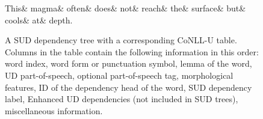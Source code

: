 \begin{figure}[h]
\begin{adjustwidth}{-50pt}{-50pt}
\centering\small
\begin{dependency}
\begin{deptext}[column sep=0.4cm]
This\& magma\& often\& does\& not\& reach\& the\& surface\& but\& cools\& at\& depth.\\
	\end{deptext} 
\end{dependency}

\vspace{.5cm}


\caption{A SUD dependency tree with a corresponding CoNLL-U table. Columns in the table contain the following information in this order: word index, word form or punctuation symbol, lemma of the word, UD part-of-speech, optional part-of-speech tag, morphological features, ID of the dependency head of the word, SUD dependency label, Enhanced UD dependencies (not included in SUD trees), miscellaneous information.}
\end{adjustwidth}
\end{figure}